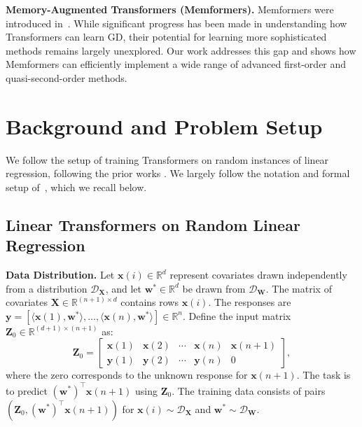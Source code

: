 \documentclass[11pt]{article}
\theoremstyle{plain}
\theoremstyle{definition}
\theoremstyle{remark}
\numberwithin{equation}{section}
\begin{document}
\noindent\textbf{Memory-Augmented Transformers (Memformers).} 
Memformers were introduced in~\citep{wu2020Memformer, xu2021transformer}. While significant progress has been made in understanding how Transformers can learn GD, their potential for learning more sophisticated methods remains largely unexplored. Our work addresses this gap and shows how Memformers can efficiently implement a wide range of advanced first-order and quasi-second-order methods. %

\section{Background and Problem Setup}
\label{Section:LinearTransformerArchitecture}
We follow the setup of training Transformers on random instances of linear regression, following the prior works \citep{garg2022can, akyurek2022learning, von2023transformers, ahn2024transformers}. We largely follow the notation and formal setup of~\citep{ahn2024transformers}, which we recall below.

\subsection{Linear Transformers on Random Linear Regression}

\textbf{Data Distribution.} Let \(\mathbf{x}(i) \in \mathbb{R}^d\) represent covariates drawn independently from a distribution \(\mathcal{D}_{\mathbf{X}}\), and let \(\mathbf{w}^* \in \mathbb{R}^d\) be drawn from \(\mathcal{D}_{\mathbf{W}}\). The matrix of covariates \(\mathbf{X} \in \mathbb{R}^{(n + 1) \times d}\) contains rows \(\mathbf{x}(i)\). The responses are \(\mathbf{y} = [\langle \mathbf{x}(1), \mathbf{w}^* \rangle, \dots, \langle \mathbf{x}(n), \mathbf{w}^* \rangle] \in \mathbb{R}^n\). Define the input matrix \(\mathbf{Z}_0 \in \mathbb{R}^{(d+1) \times (n+1)}\) as:
\begin{equation}
\mathbf{Z}_0 = 
\begin{bmatrix}
\mathbf{x}(1) & \mathbf{x}(2) & \cdots & \mathbf{x}(n) & \mathbf{x}(n+1) \\
\mathbf{y}(1) & \mathbf{y}(2) & \cdots & \mathbf{y}(n) & 0
\end{bmatrix},
\end{equation}
where the zero corresponds to the unknown response for \(\mathbf{x}(n+1)\). The task is to predict \((\mathbf{w}^*)^{\top} \mathbf{x}(n+1)\) using \(\mathbf{Z}_0\). The training data consists of pairs \((\mathbf{Z}_0, (\mathbf{w}^*)^\top \mathbf{x}(n+1))\) for \(\mathbf{x}(i) \sim \mathcal{D}_{\mathbf{X}}\) and \(\mathbf{w}^* \sim \mathcal{D}_{\mathbf{W}}\).
\end{document}
